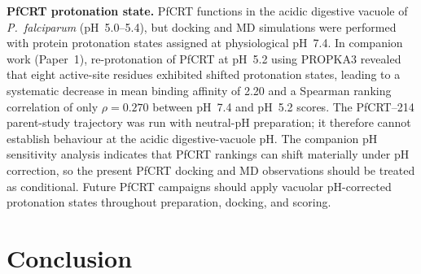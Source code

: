 \documentclass[11pt,a4paper]{article}
\begin{document}
\textbf{PfCRT protonation state.}
PfCRT functions in the acidic digestive vacuole of \textit{P.\ falciparum} (pH~\numrange{5.0}{5.4}), but docking and MD simulations were performed with protein protonation states assigned at physiological pH~\num{7.4}. In companion work (Paper~\num{1}), re-protonation of PfCRT at pH~\num{5.2} using PROPKA3 revealed that eight active-site residues exhibited shifted protonation states, leading to a systematic decrease in mean binding affinity of \SI{+2.20}{\kcalmol} and a Spearman ranking correlation of only $\rho = \num{0.270}$ between pH~\num{7.4} and pH~\num{5.2} scores. The PfCRT--214 parent-study trajectory was run with neutral-pH preparation; it therefore cannot establish behaviour at the acidic digestive-vacuole pH. The companion pH sensitivity analysis indicates that PfCRT rankings can shift materially under pH correction, so the present PfCRT docking and MD observations should be treated as conditional. Future PfCRT campaigns should apply vacuolar pH-corrected protonation states throughout preparation, docking, and scoring.


\section{Conclusion}
\end{document}
